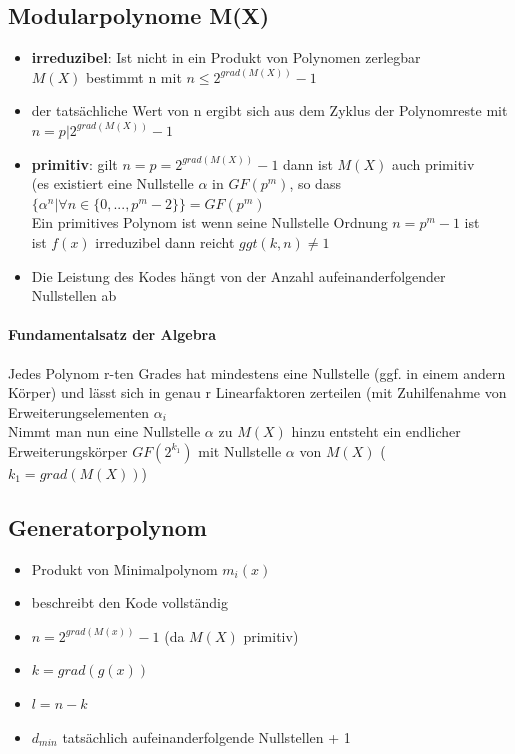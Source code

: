 \documentclass[12pt,a4paper]{article}
\begin{document}
\subsection{Modularpolynome M(X)}
\begin{itemize}
\item \textbf{irreduzibel}: Ist nicht in ein Produkt von Polynomen zerlegbar\\
$M(X)$ bestimmt n mit $n \leq 2^{grad(M(X))} -1$
\item der tatsächliche Wert von n ergibt sich aus dem Zyklus der Polynomreste mit\\
$n = p \vert 2^{grad(M(X))} -1 $
\item \textbf{primitiv}: gilt $n=p=2^{grad(M(X))} - 1$ dann ist $M(X)$ auch primitiv\\
(es existiert eine Nullstelle $\alpha$ in $GF(p^m)$, so dass\\
$\{\alpha^n | \forall n \in \{0,...,p^m-2 \} \} = GF(p^m)$\\
Ein primitives Polynom ist wenn seine Nullstelle Ordnung $n = p^m - 1$ ist\\
ist $f(x)$ irreduzibel dann reicht $ggt(k,n) \neq 1$
\item Die Leistung des Kodes hängt von der Anzahl aufeinanderfolgender Nullstellen ab
\end{itemize}

\paragraph{Fundamentalsatz der Algebra\\}
Jedes Polynom r-ten Grades hat mindestens eine Nullstelle (ggf. in einem andern Körper) und lässt sich in genau r  Linearfaktoren zerteilen (mit Zuhilfenahme von Erweiterungselementen $\alpha_i$\\
Nimmt man nun eine Nullstelle $\alpha$ zu $M(X)$ hinzu entsteht ein endlicher Erweiterungskörper $GF(2^{k_1})$ mit Nullstelle $\alpha$ von $M(X)$ ($k_1 = grad(M(X))$)

\subsection{Generatorpolynom}
\begin{itemize}
\item Produkt von Minimalpolynom $m_i(x)$
\item beschreibt den Kode vollständig
\item $n = 2^{grad(M(x))} - 1 $ (da $M(X)$ primitiv)
\item $k = grad(g(x))$
\item $l = n-k$
\item $d_{min}$ tatsächlich aufeinanderfolgende Nullstellen + 1
\end{itemize}
\end{document}
